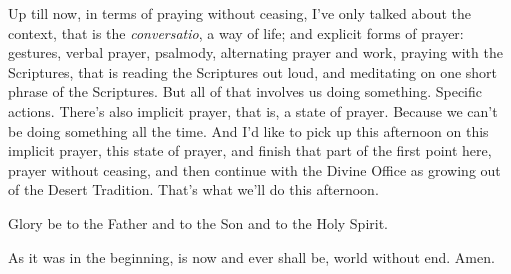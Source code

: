 Up till now, in terms of praying without ceasing, I've only talked about the context, that is the \emph{conversatio}, a way of life; and explicit forms of prayer: gestures, verbal prayer, psalmody, alternating prayer and work, praying with the Scriptures, that is reading the Scriptures out loud, and meditating on one short phrase of the Scriptures. But all of that involves us doing something. Specific actions. There's also implicit prayer, that is, a state of prayer. Because we can't be doing something all the time. And I'd like to pick up this afternoon on this implicit prayer, this state of prayer, and finish that part of the first point here, prayer without ceasing, and then continue with the Divine Office as growing out of the Desert Tradition. That's what we'll do this afternoon.

Glory be to the Father and to the Son and to the Holy Spirit.

As it was in the beginning, is now and ever shall be, world without end. Amen.
